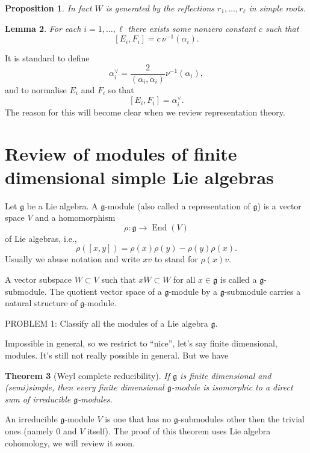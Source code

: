 \documentclass[12pt]{article}
\theoremstyle{plain}
\newtheorem{thm}{Theorem}[section]
\newtheorem{lemma}[thm]{Lemma}
\newtheorem{prop}[thm]{Proposition}
\theoremstyle{definition}
\numberwithin{equation}{section}
\DeclareMathOperator{\ad}{ad}
\DeclareMathOperator{\en}{End}
\newcommand{\g}{\mathfrak{g}}
\newcommand{\h}{\mathfrak{h}}
\begin{document}
\begin{prop}
In fact $W$ is generated by the reflections $r_1, \ldots, r_\ell$ in simple roots.
\end{prop}



\begin{lemma}
For each $i = 1, \ldots, \ell$ there exists some nonzero constant $c$ such that
\[
[E_i, F_i] = c \, \nu^{-1}(\alpha_i).
\]
\end{lemma}
It is standard to define
\[
\alpha_i^\vee = \frac{2}{(\alpha_i, \alpha_i)} \nu^{-1}(\alpha_i),
\]
and to normalise $E_i$ and $F_i$ so that
\[
[E_i, F_i] = \alpha_i^\vee.
\]
The reason for this will become clear when we review representation theory.






\section{Review of modules of finite dimensional simple Lie algebras}

Let $\g$ be a Lie algebra. A $\g$-module (also called a representation of $\g$) is a vector space $V$ and a homomorphism
\[
\rho : \g \rightarrow \en(V)
\]
of Lie algebras, i.e.,
\[
\rho([x, y]) = \rho(x) \rho(y) - \rho(y) \rho(x).
\]
Usually we abuse notation and write $x v$ to stand for $\rho(x)v$.

A vector subspace $W \subset V$ such that $xW \subset W$ for all $x \in \g$ is called a $\g$-submodule. The quotient vector space of a $\g$-module by a $\g$-submodule carries a natural structure of $\g$-module.

PROBLEM 1: Classify all the modules of a Lie algebra $\g$.

Impossible in general, so we restrict to ``nice'', let's say finite dimensional, modules. It's still not really possible in general. But we have
\begin{thm}[Weyl complete reducibility]
If $\g$ is finite dimensional and (semi)simple, then every finite dimensional $\g$-module is isomorphic to a direct sum of irreducible $\g$-modules.
\end{thm}
An irreducible $\g$-module $V$ is one that has no $\g$-submodules other then the trivial ones (namely $0$ and $V$ itself). The proof of this theorem uses Lie algebra cohomology, we will review it soon.
\end{document}
